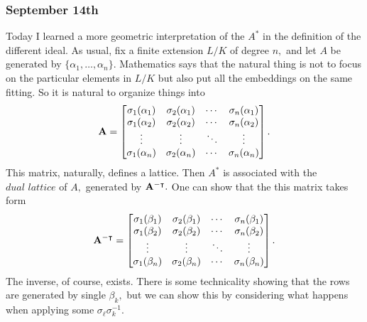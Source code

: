 \subsubsection{September 14th}
Today I learned a more geometric interpretation of the $A^*$ in the definition of the different ideal. As usual, fix a finite extension $L/K$ of degree $n,$ and let $A$ be generated by $\{\alpha_1,\ldots,\alpha_n\}.$ Mathematics says that the natural thing is not to focus on the particular elements in $L/K$ but also put all the embeddings on the same fitting. So it is natural to organize things into
\[{\bf A}=\begin{bmatrix}
    \sigma_1(\alpha_1) & \sigma_2(\alpha_1) & \cdots & \sigma_n(\alpha_1) \\
    \sigma_1(\alpha_2) & \sigma_2(\alpha_2) & \cdots & \sigma_n(\alpha_2) \\
    \vdots & \vdots & \ddots & \vdots \\
    \sigma_1(\alpha_n) & \sigma_2(\alpha_n) & \cdots & \sigma_n(\alpha_n)
\end{bmatrix}.\]
This matrix, naturally, defines a lattice. Then $A^*$ is associated with the $\textit{dual lattice}$ of $A,$ generated by ${\bf A}^{-\intercal}.$ One can show that the this matrix takes form
\[{\bf A}^{-\intercal}=\begin{bmatrix}
    \sigma_1(\beta_1) & \sigma_2(\beta_1) & \cdots & \sigma_n(\beta_1) \\
    \sigma_1(\beta_2) & \sigma_2(\beta_2) & \cdots & \sigma_n(\beta_2) \\
    \vdots & \vdots & \ddots & \vdots \\
    \sigma_1(\beta_n) & \sigma_2(\beta_n) & \cdots & \sigma_n(\beta_n)
\end{bmatrix}.\]
The inverse, of course, exists. There is some technicality showing that the rows are generated by single $\beta_k,$ but we can show this by considering what happens when applying some $\sigma_\ell\sigma_k^{-1}.$


